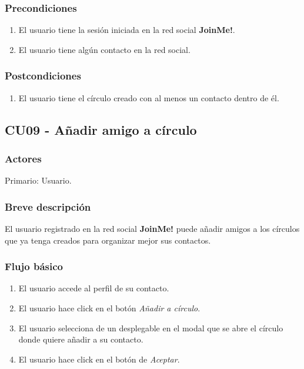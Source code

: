\documentclass[12pt, a4paper, titlepage]{article}
\begin{document}
	
\subsubsection{Precondiciones}
	\begin{enumerate}
		\item El usuario tiene la sesión iniciada en la red social \textbf{JoinMe!}.
		\item El usuario tiene algún contacto en la red social.
	\end{enumerate}
\subsubsection{Postcondiciones}
	\begin{enumerate}
		\item El usuario tiene el círculo creado con al menos un contacto dentro de él.
	\end{enumerate}



\subsection{CU09 - Añadir amigo a círculo}
\subsubsection{Actores}
Primario: Usuario.
\subsubsection{Breve descripción}
El usuario registrado en la red social \textbf{JoinMe!}  puede añadir amigos a los círculos que ya tenga creados para organizar mejor sus contactos.
\subsubsection{Flujo básico}
	\begin{enumerate}
		\item El usuario accede al perfil de su contacto.
		\item El usuario hace click en el botón \textit{Añadir a círculo}.
		\item El usuario selecciona de un desplegable en el modal que se abre el círculo donde quiere añadir a su contacto.
		\item El usuario hace click en el botón de \textit{Aceptar}.
	\end{enumerate}
	
\end{document}
